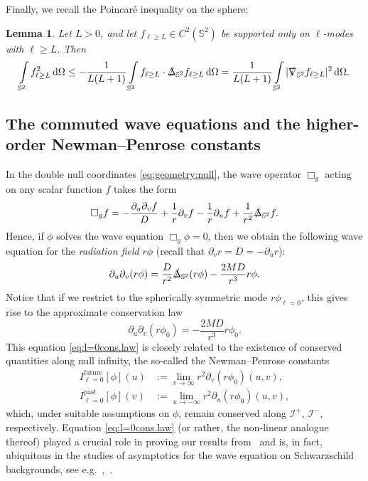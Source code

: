 \documentclass[11pt,english]{article}
\numberwithin{equation}{section}
\newtheorem{lemma}{Lemma}[section]
\theoremstyle{remark}
\theoremstyle{plain}
\theoremstyle{remark}
\newcommand{\dd}{\mathop{}\!\mathrm{d}}
\newcommand{\pu}{\partial_u}
\newcommand{\pv}{\partial_v}
\renewcommand{\(}{\left(}
\renewcommand{\)}{\right)}
\newcommand{\ILn}[1]{I_{\ell=#1}^{\mathrm{future}}}
\newcommand{\ILpn}[1]{I_{\ell=#1}^{\mathrm{past}}}
\begin{document}
Finally, we recall the Poincar\'e inequality on the sphere:
\begin{lemma}
Let $L>0$, and let $f_{\ell\geq L}\in C^2({\mathbb S^2})$ be supported only on  $\ell$-modes with $\ell\geq L$. Then
\begin{equation}\label{poincare}
\int\limits_{\mathbb S^2} f_{\ell\geq L}^2\dd \Omega\leq 
-\frac{1}{L(L+1)}\int\limits_{\mathbb S^2}f_{\ell\geq L}\cdot \slashed{\Delta}_{\mathbb S^2}f_{\ell\geq L} 	\dd \Omega=
\frac{1}{L(L+1)}\int\limits_{\mathbb S^2} |\slashed{\nabla}_{\mathbb S^2}f_{\ell\geq L}|^2\dd \Omega.
\end{equation}
\end{lemma}



\subsection{The commuted wave equations and the higher-order Newman--Penrose constants}\label{sec:thecommutedequations}
In the double null coordinates \eqref{eq:geometry:null}, the wave operator $\Box_g$ acting on any scalar function $f$ takes the form
\begin{equation}\label{eq:box}
\Box_g f=-\frac{\pu\pv f}{D}+\frac{1}{r}\pv f-\frac{1}{r}\pu f+\frac{1}{r^2}\slashed{\Delta}_{\mathbb{S}^2}f.
\end{equation}
Hence, if $\phi$ solves the wave equation $\Box_g\phi=0$, then we obtain the following wave equation for the \textit{radiation field} $r\phi$ (recall that $\pv r=D=-\pu r$):
\begin{equation}\label{eq:pupv rphi general}
\pu\pv(r\phi)=\frac{D}{r^2}\slashed{\Delta}_{\mathbb{S}^2}(r\phi)-\frac{2MD}{r^3}r\phi.
\end{equation}
Notice that if we restrict to the spherically symmetric mode $r\phi_{\ell=0}$, this gives rise to the approximate conservation law
\begin{equation}\label{eq:l=0cons.law}
\pu\pv(r\phi_0)=-\frac{2MD}{r^3}r\phi_0.
\end{equation}
This equation \eqref{eq:l=0cons.law} is closely related to the existence of conserved quantities along null infinity, the so-called the Newman--Penrose constants
\begin{align}
\ILn0[\phi](u)&:=\lim_{v\to\infty}r^2\pv(r\phi_0)(u,v),\\
\ILpn0[\phi](v)&:=\lim_{u\to-\infty}r^2\pu (r\phi_0)(u,v),
\end{align}
which, under suitable assumptions on $\phi$, remain conserved along $\mathcal{I}^+$, $\mathcal{I}^-$, respectively. Equation \eqref{eq:l=0cons.law} (or rather, the non-linear analogue thereof) played a crucial role in proving our results from~\cite{I} and is, in fact, ubiquitous in the studies of asymptotics for the wave equation on Schwarzschild backgrounds, see e.g.~\cite{DR05},~\cite{AAG18b}.
\end{document}
